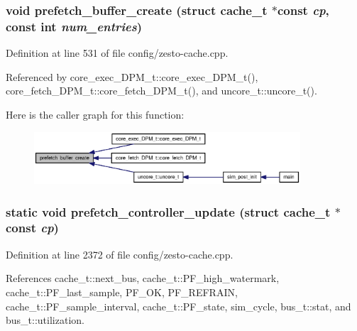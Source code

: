 \subsubsection[{prefetch\_\-buffer\_\-create}]{\setlength{\rightskip}{0pt plus 5cm}void prefetch\_\-buffer\_\-create (struct {\bf cache\_\-t} $\ast$const  {\em cp}, \/  const int {\em num\_\-entries})}\label{config_2zesto-cache_8cpp_16dacff1f1e08b2a7fe82d35f3733f91}




Definition at line 531 of file config/zesto-cache.cpp.

Referenced by core\_\-exec\_\-DPM\_\-t::core\_\-exec\_\-DPM\_\-t(), core\_\-fetch\_\-DPM\_\-t::core\_\-fetch\_\-DPM\_\-t(), and uncore\_\-t::uncore\_\-t().

Here is the caller graph for this function:\nopagebreak
\begin{figure}[H]
\begin{center}
\leavevmode
\includegraphics[width=281pt]{config_2zesto-cache_8cpp_16dacff1f1e08b2a7fe82d35f3733f91_icgraph}
\end{center}
\end{figure}
\subsubsection[{prefetch\_\-controller\_\-update}]{\setlength{\rightskip}{0pt plus 5cm}static void prefetch\_\-controller\_\-update (struct {\bf cache\_\-t} $\ast$const  {\em cp})\hspace{0.3cm}{\tt  [static]}}\label{config_2zesto-cache_8cpp_563b4fe087e7d8225f1e3aea2f1e8235}




Definition at line 2372 of file config/zesto-cache.cpp.

References cache\_\-t::next\_\-bus, cache\_\-t::PF\_\-high\_\-watermark, cache\_\-t::PF\_\-last\_\-sample, PF\_\-OK, PF\_\-REFRAIN, cache\_\-t::PF\_\-sample\_\-interval, cache\_\-t::PF\_\-state, sim\_\-cycle, bus\_\-t::stat, and bus\_\-t::utilization.


